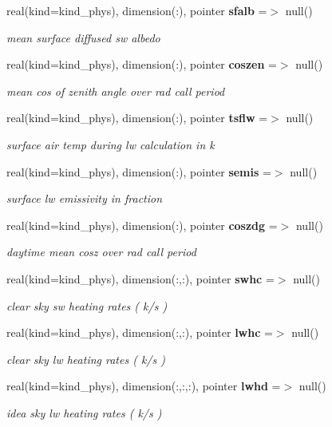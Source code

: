 \begin{DoxyCompactItemize}
real(kind=kind\+\_\+phys), dimension(\+:), pointer \textbf{ sfalb} =$>$ null()
\begin{DoxyCompactList}\small\item\em mean surface diffused sw albedo \end{DoxyCompactList}\item 
real(kind=kind\+\_\+phys), dimension(\+:), pointer \textbf{ coszen} =$>$ null()
\begin{DoxyCompactList}\small\item\em mean cos of zenith angle over rad call period \end{DoxyCompactList}\item 
real(kind=kind\+\_\+phys), dimension(\+:), pointer \textbf{ tsflw} =$>$ null()
\begin{DoxyCompactList}\small\item\em surface air temp during lw calculation in k \end{DoxyCompactList}\item 
real(kind=kind\+\_\+phys), dimension(\+:), pointer \textbf{ semis} =$>$ null()
\begin{DoxyCompactList}\small\item\em surface lw emissivity in fraction \end{DoxyCompactList}\item 
real(kind=kind\+\_\+phys), dimension(\+:), pointer \textbf{ coszdg} =$>$ null()
\begin{DoxyCompactList}\small\item\em daytime mean cosz over rad call period \end{DoxyCompactList}\item 
real(kind=kind\+\_\+phys), dimension(\+:,\+:), pointer \textbf{ swhc} =$>$ null()
\begin{DoxyCompactList}\small\item\em clear sky sw heating rates ( k/s ) \end{DoxyCompactList}\item 
real(kind=kind\+\_\+phys), dimension(\+:,\+:), pointer \textbf{ lwhc} =$>$ null()
\begin{DoxyCompactList}\small\item\em clear sky lw heating rates ( k/s ) \end{DoxyCompactList}\item 
real(kind=kind\+\_\+phys), dimension(\+:,\+:,\+:), pointer \textbf{ lwhd} =$>$ null()
\begin{DoxyCompactList}\small\item\em idea sky lw heating rates ( k/s ) \end{DoxyCompactList}\end{DoxyCompactItemize}


